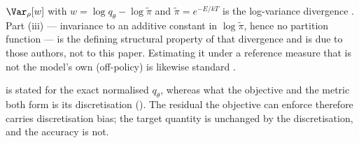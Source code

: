 \begin{remark}[Attribution]
\label{rem:logvar}
$\Var_\rho[w]$ with $w = \log q_\theta - \log\tilde\pi$ and
$\tilde\pi = e^{-E/kT}$ is the log-variance divergence \citep{vargrad,
nusken2021pathspace,richter2024improvedsampling}. Part (iii) --- invariance to
an additive constant in $\log\tilde\pi$, hence no partition function --- is the
defining structural property of that divergence and is due to those authors, not
to this paper. Estimating it under a reference measure that is not the model's own
(off-policy) is likewise standard \citep{nusken2021pathspace,sendera2024offpolicy}.
\end{remark}

\begin{remark}
\label{rem:epscert}
 is stated for the exact normalised $q_\theta$, whereas what
the objective and the metric both form is its discretisation
(). The residual the objective can enforce therefore
carries discretisation bias; the target quantity is unchanged by the discretisation,
and the accuracy is not.
\end{remark}

